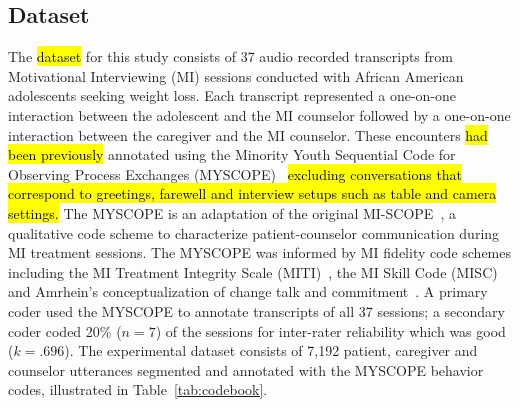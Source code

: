 \documentclass[smallextended]{svjour3}       %
\begin{document}
\subsection{Dataset}
\label{subsec:dataset}
The \hl{dataset} for this study consists of 37 audio recorded transcripts from Motivational Interviewing (MI) sessions conducted with African American adolescents seeking weight loss. Each transcript represented a one-on-one interaction between the adolescent and the MI counselor followed by a one-on-one interaction between the caregiver and the MI counselor. These encounters \hl{had been previously} annotated using the Minority Youth Sequential Code for Observing Process Exchanges (MYSCOPE)~\cite{carcone2013provider} \hl{excluding conversations that correspond to greetings, farewell and interview setups such as table and camera settings.} The MYSCOPE is an adaptation of the original MI-SCOPE~\cite{martin2005motivational}, a qualitative code scheme to characterize patient-counselor communication during MI treatment sessions. The MYSCOPE was informed by MI fidelity code schemes including the MI Treatment Integrity Scale (MITI)~\cite{moyers2005assessing}, the MI Skill Code (MISC)~\cite{apodaca2007motivational} and Amrhein's conceptualization of change talk and commitment~\cite{amrhein2004does}. A primary coder used the MYSCOPE to annotate transcripts of all 37 sessions; a secondary coder coded 20\% ($n = 7$) of the sessions for inter-rater reliability which was good ($k = .696$). The experimental dataset consists of 7,192 patient, caregiver and counselor utterances segmented and annotated with the MYSCOPE behavior codes, illustrated in Table~\ref{tab:codebook}.
\end{document}
